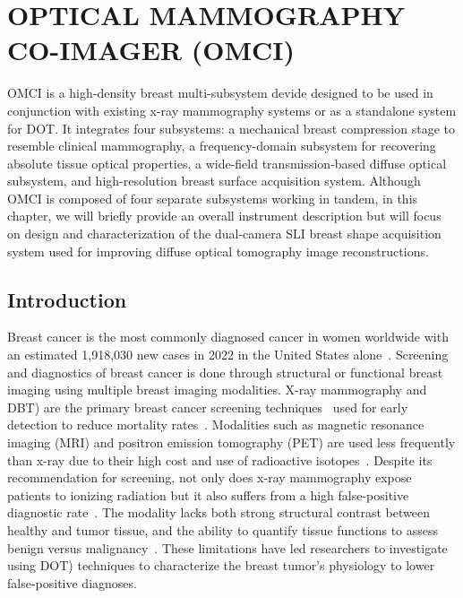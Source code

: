 
\chapter{OPTICAL MAMMOGRAPHY CO-IMAGER (OMCI)} %
\label{chap:omci}
\ac{OMCI} is a high-density breast multi-subsystem devide designed to be used in conjunction with existing x-ray mammography systems or as a standalone system for \ac{DOT}. It integrates four subsystems: a mechanical breast compression stage to resemble clinical mammography, a frequency-domain subsystem for recovering absolute tissue optical properties, a wide-field transmission-based diffuse optical subsystem, and high-resolution breast surface acquisition system. Although \ac{OMCI} is composed of four separate subsystems working in tandem, in this chapter, we will briefly provide an overall instrument description but will focus on design and characterization of the dual-camera \ac{SLI} breast shape acquisition system used for improving diffuse optical tomography image reconstructions.


\section{Introduction} %
\label{chap:omci:introduction}
Breast cancer is the most commonly diagnosed cancer in women worldwide with an estimated 1,918,030 new cases in 2022 in the United States alone~\cite{Siegel2022}. Screening and diagnostics of breast cancer is done through structural or functional breast imaging using multiple breast imaging modalities. X-ray mammography and \ac{DBT}) are the primary breast cancer screening techniques~\cite{Secretan2015} used for early detection to reduce mortality rates~\cite{Tabar2003}. Modalities such as magnetic resonance imaging (\ac{MRI}) and positron emission tomography (\ac{PET}) are used less frequently than x-ray due to their high cost and use of radioactive isotopes~\cite{Secretan2015}. Despite its recommendation for screening, not only does x-ray mammography expose patients to ionizing radiation but it also suffers from a high false-positive diagnostic rate~\cite{Tabar2003, Elmore1998}. The modality lacks both strong structural contrast between healthy and tumor tissue, and the ability to quantify tissue functions to assess benign versus malignancy~\cite{Leff2008}. These limitations have led researchers to investigate using \ac{DOT}) techniques to characterize the breast tumor's physiology to lower false-positive diagnoses. 

